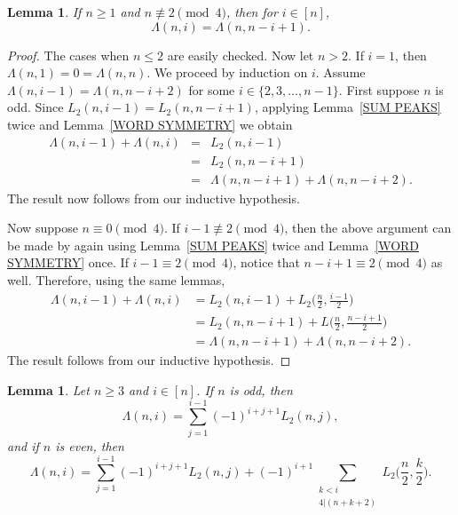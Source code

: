 \documentclass[12pt]{article}
\theoremstyle{plain}
\newtheorem{lemma}[theorem]{Lemma}
\theoremstyle{definition}
\begin{document}
\begin{lemma}\label{SYMMETRY LEMMA}
If $n\geq 1$ and $n \not\equiv 2\!\pmod 4$, then for $i \in [n]$, $$\Lambda(n,i)=\Lambda(n,n-i+1).$$ 
\end{lemma}
\begin{proof} The cases when $n\leq 2$ are easily checked. 
Now let $n>2$. If $i=1$, then $\Lambda(n,1)=0=\Lambda(n,n)$. We proceed by induction on $i$.  Assume $\Lambda(n,i-1)=\Lambda(n,n-i+2)$ for some $i \in\{2,3,\ldots,n-1\}$.  First suppose $n$ is odd. Since $L_2(n,i-1)=L_2(n,n-i+1)$, applying Lemma~\ref{SUM PEAKS} twice and Lemma~\ref{WORD SYMMETRY} we obtain
	\begin{eqnarray*} \Lambda(n,i-1)+\Lambda(n,i)&=&L_2(n,i-1) \\
		&=& L_2(n,n-i+1)\\
		&=&\Lambda(n,n-i+1)+\Lambda(n,n-i+2).
	\end{eqnarray*}
The result now follows from our inductive hypothesis.

Now suppose $n \equiv 0 \!\pmod 4$. If $i-1 \not\equiv 2\!\pmod 4$, then the above argument can be made by again using Lemma~\ref{SUM PEAKS} twice and Lemma~\ref{WORD SYMMETRY} once. If $i-1 \equiv 2\!\pmod 4$, notice that $n-i+1 \equiv 2 \!\pmod 4$ as well. Therefore, using the same lemmas, 
\begin{align*}\Lambda(n,i-1)+\Lambda(n,i)&=L_2(n,i-1) + L_2\bigg(\frac{n}{2}, \frac{i-1}{2}\bigg) \\
&=L_2(n,n-i+1) + L\bigg(\frac{n}{2}, \frac{n-i+1}{2}\bigg) \\
&=\Lambda(n,n-i+1)+\Lambda(n,n-i+2).\end{align*}
The result follows from our inductive hypothesis.
\end{proof}

	



\begin{lemma}\label{UP DOWN PEAK}
Let $n \geq 3$ and $i\in[n]$. If $n$ is odd, then
	\[\Lambda(n,i)= \sum_{j=1}^{i-1} (-1)^{i+j+1} L_2(n,j),\]
	and if $n$ is even, then
\[	\Lambda(n,i)=	 \sum_{j=1}^{i-1} (-1)^{i+j+1} L_2(n,j) + (-1)^{i+1}\!\!\sum_{\substack{k<i\\4|(n+k+2)}}\! L_2 \bigg(\frac n2,\frac k2\bigg).\]
\end{lemma}
\end{document}
